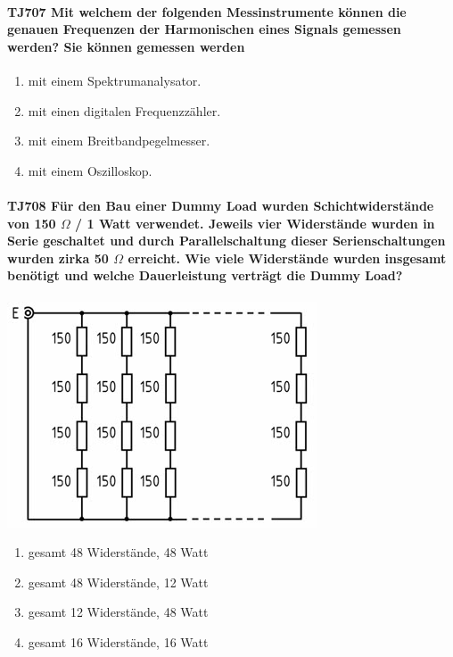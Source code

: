 \documentclass[8pt]{article}
\begin{document}
\paragraph*{TJ707 Mit welchem der folgenden Messinstrumente können die genauen Frequenzen der Harmonischen eines Signals gemessen werden? Sie können gemessen werden}
\begin{enumerate}[nolistsep,label=\Alph*]
\item mit einem Spektrumanalysator.
\item mit einen digitalen Frequenzzähler.
\item mit einem Breitbandpegelmesser.
\item mit einem Oszilloskop.
\end{enumerate}

\paragraph*{TJ708 Für den Bau einer Dummy Load wurden Schichtwiderstände von 150 $\Omega$ / 1 Watt verwendet. Jeweils vier Widerstände wurden in Serie geschaltet und durch Parallelschaltung dieser Serienschaltungen wurden zirka 50 $\Omega$ erreicht. Wie viele Widerstände wurden insgesamt benötigt und welche Dauerleistung verträgt die Dummy Load?}
\begin{center}
	\begin{minipage}{\linewidth}
		\centering
		\includegraphics[scale=1.0]{pics/tj708_a.jpg}
	\end{minipage}
\end{center}
\begin{enumerate}[nolistsep,label=\Alph*]
\item gesamt 48 Widerstände, 48 Watt
\item gesamt 48 Widerstände, 12 Watt
\item gesamt 12 Widerstände, 48 Watt
\item gesamt 16 Widerstände, 16 Watt
\end{enumerate}
\end{document}

